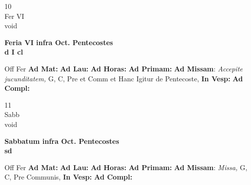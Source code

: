 \documentclass[10pt, openany]{book}
\begin{document}
    \begin{center}
        \begin{minipage}{3.5in}
            \vspace{2em}
            \begin{minipage}{0.5in}
                {\Huge 10} \\
                {\normalsize Fer VI} \\
                {\normalsize void}
            \end{minipage}
            \begin{minipage}{3.0in}
                \textbf{ \large Feria VI infra Oct. Pentecostes \\
                \textnormal{\normalsize d I cl}} \\ 
            \end{minipage}
            \begin{justify}Off Fer
                \textbf{Ad Mat: }
                \textbf{Ad Lau: }
                \textbf{Ad Horas: }
                \textbf{Ad Primam: }\textbf{Ad Missam}: \textit{Accepite jucunditatem,} G, C, Pre et Comm et Hanc Igitur de Pentecoste,  
                \textbf{In Vesp: }
                \textbf{Ad Compl: }
            \end{justify}
        \end{minipage}
    \end{center}

    \begin{center}
        \begin{minipage}{3.5in}
            \vspace{2em}
            \begin{minipage}{0.5in}
                {\Huge 11} \\
                {\normalsize Sabb} \\
                {\normalsize void}
            \end{minipage}
            \begin{minipage}{3.0in}
                \textbf{ \large Sabbatum infra Oct. Pentecostes \\
                \textnormal{\normalsize sd}} \\ 
            \end{minipage}
            \begin{justify}Off Fer
                \textbf{Ad Mat: }
                \textbf{Ad Lau: }
                \textbf{Ad Horas: }
                \textbf{Ad Primam: }\textbf{Ad Missam}: \textit{Missa,} G, C, Pre Communis,  
                \textbf{In Vesp: }
                \textbf{Ad Compl: }
            \end{justify}
        \end{minipage}
    \end{center}
\end{document}
